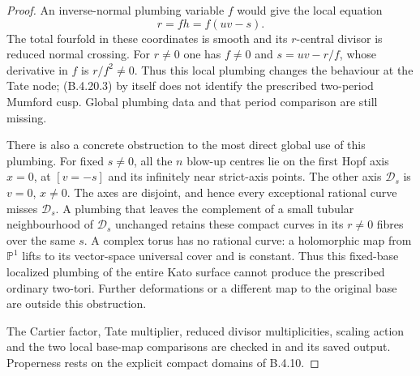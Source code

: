 \begin{proof}
An inverse-normal plumbing variable $f$ would
give the local equation
\[
 r=fh=f(uv-s).
 \tag{B.4.20.3}
\]
The total fourfold in these coordinates is
smooth and its $r$-central divisor is reduced
normal crossing. For $r\ne0$ one has $f\ne0$
and $s=uv-r/f$, whose derivative in $f$ is
$r/f^2\ne0$. Thus this local plumbing changes
the behaviour at the Tate node; (B.4.20.3) by
itself does not identify the prescribed two-period
Mumford cusp. Global plumbing data and that
period comparison are still missing.

There is also a concrete obstruction to the most
direct global use of this plumbing. For fixed
$s\ne0$, all the $n$ blow-up centres lie on the
first Hopf axis $x=0$, at $[v=-s]$ and its
infinitely near strict-axis points. The other
axis $\mathcal D_s$ is $v=0$, $x\ne0$.
The axes are disjoint, and hence every exceptional
rational curve misses $\mathcal D_s$. A plumbing
that leaves the complement of a small tubular
neighbourhood of $\mathcal D_s$ unchanged retains
these compact curves in its $r\ne0$ fibres over
the same $s$. A complex torus has no rational
curve: a holomorphic map from $\mathbb P^1$
lifts to its vector-space universal cover and
is constant. Thus this fixed-base localized
plumbing of the entire Kato surface cannot
produce the prescribed ordinary two-tori.
Further deformations or a different map to the
original base are outside this obstruction.

The Cartier factor, Tate multiplier, reduced
divisor multiplicities, scaling action and the
two local base-map comparisons are checked in
 and
its saved output. Properness rests on the
explicit compact domains of B.4.10.
\end{proof}
